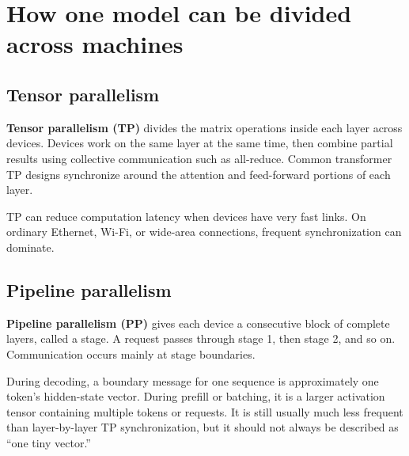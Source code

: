 \documentclass[10pt,a4paper]{article}
\newcommand{\term}[1]{\textbf{\color{navy}#1}}
\begin{document}
\section{How one model can be divided across machines}

\subsection{Tensor parallelism}

\term{Tensor parallelism (TP)} divides the matrix operations inside each layer across devices. Devices work on the same layer at the same time, then combine partial results using collective communication such as all-reduce. Common transformer TP designs synchronize around the attention and feed-forward portions of each layer.

TP can reduce computation latency when devices have very fast links. On ordinary Ethernet, Wi-Fi, or wide-area connections, frequent synchronization can dominate.

\subsection{Pipeline parallelism}

\term{Pipeline parallelism (PP)} gives each device a consecutive block of complete layers, called a stage. A request passes through stage 1, then stage 2, and so on. Communication occurs mainly at stage boundaries.

During decoding, a boundary message for one sequence is approximately one token's hidden-state vector. During prefill or batching, it is a larger activation tensor containing multiple tokens or requests. It is still usually much less frequent than layer-by-layer TP synchronization, but it should not always be described as ``one tiny vector.''
\end{document}
